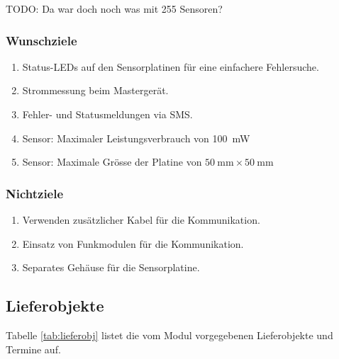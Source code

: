 \textsc{TODO}: Da war doch noch was mit 255 Sensoren?


\subsubsection{Wunschziele}

\begin{enumerate}
    \item
        Status-LEDs auf den Sensorplatinen f\"ur eine einfachere Fehlersuche.
    \item
        Strommessung beim Masterger\"at.
    \item
        Fehler- und Statusmeldungen via SMS.
    \item
        Sensor: Maximaler Leistungsverbrauch von \SI{100}{\milli\watt}
	\item
		Sensor: Maximale Gr\"osse der Platine von $\SI{50}{\milli\meter} \times \SI{50}{\milli\meter}$
\end{enumerate}


\subsubsection{Nichtziele}

\begin{enumerate}
    \item
        Verwenden zus\"atzlicher Kabel f\"ur die Kommunikation.
    \item
        Einsatz von Funkmodulen f\"ur die Kommunikation.
    \item
        Separates Geh\"ause f\"ur die Sensorplatine.
\end{enumerate}

\subsection{Lieferobjekte}

Tabelle \ref{tab:lieferobj}  listet die  vom Modul  vorgegebenen Lieferobjekte
und Termine auf.


